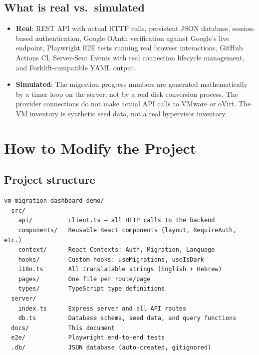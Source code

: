 \documentclass[12pt,a4paper]{article}
\begin{document}
\subsection{What is real vs.\ simulated}

\begin{itemize}
  \item \textbf{Real}: REST API with actual HTTP calls, persistent JSON database, session-based authentication, Google OAuth verification against Google's live endpoint, Playwright E2E tests running real browser interactions, GitHub Actions CI, Server-Sent Events with real connection lifecycle management, and Forklift-compatible YAML output.

  \item \textbf{Simulated}: The migration progress numbers are generated mathematically by a timer loop on the server, not by a real disk conversion process. The provider connections do not make actual API calls to VMware or oVirt. The VM inventory is synthetic seed data, not a real hypervisor inventory.
\end{itemize}

\section{How to Modify the Project}
\label{sec:modify}

\subsection{Project structure}

\begin{lstlisting}[language={}]
vm-migration-dashboard-demo/
  src/
    api/          client.ts — all HTTP calls to the backend
    components/   Reusable React components (layout, RequireAuth, etc.)
    context/      React Contexts: Auth, Migration, Language
    hooks/        Custom hooks: useMigrations, useIsDark
    i18n.ts       All translatable strings (English + Hebrew)
    pages/        One file per route/page
    types/        TypeScript type definitions
  server/
    index.ts      Express server and all API routes
    db.ts         Database schema, seed data, and query functions
  docs/           This document
  e2e/            Playwright end-to-end tests
  .db/            JSON database (auto-created, gitignored)
\end{lstlisting}
\end{document}
